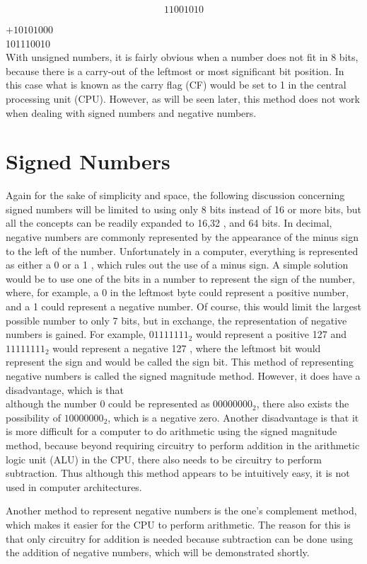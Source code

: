 \documentclass[10pt]{book}
\begin{document}
$$
11001010
$$

$+10101000$\\
101110010\\
With unsigned numbers, it is fairly obvious when a number does not fit in 8 bits, because there is a carry-out of the leftmost or most significant bit position. In this case what is known as the carry flag (CF) would be set to 1 in the central processing unit (CPU). However, as will be seen later, this method does not work when dealing with signed numbers and negative numbers.

\section{Signed Numbers}
Again for the sake of simplicity and space, the following discussion concerning signed numbers will be limited to using only 8 bits instead of 16 or more bits, but all the concepts can be readily expanded to 16,32 , and 64 bits. In decimal, negative numbers are commonly represented by the appearance of the minus sign to the left of the number. Unfortunately in a computer, everything is represented as either a 0 or a 1 , which rules out the use of a minus sign. A simple solution would be to use one of the bits in a number to represent the sign of the number, where, for example, a 0 in the leftmost byte could represent a positive number, and a 1 could represent a negative number. Of course, this would limit the largest possible number to only 7 bits, but in exchange, the representation of negative numbers is gained. For example, $01111111_{2}$ would represent a positive 127 and $11111111_{2}$ would represent a negative 127 , where the leftmost bit would represent the sign and would be called the sign bit. This method of representing negative numbers is called the signed magnitude method. However, it does have a disadvantage, which is that\\
although the number 0 could be represented as $00000000_{2}$, there also exists the possibility of $10000000_{2}$, which is a negative zero. Another disadvantage is that it is more difficult for a computer to do arithmetic using the signed magnitude method, because beyond requiring circuitry to perform addition in the arithmetic logic unit (ALU) in the CPU, there also needs to be circuitry to perform subtraction. Thus although this method appears to be intuitively easy, it is not used in computer architectures.

Another method to represent negative numbers is the one's complement method, which makes it easier for the CPU to perform arithmetic. The reason for this is that only circuitry for addition is needed because subtraction can be done using the addition of negative numbers, which will be demonstrated shortly.
\end{document}
